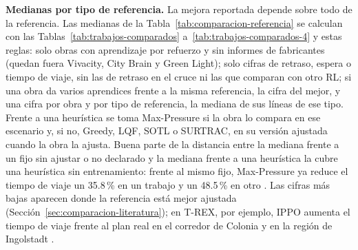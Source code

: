 \textbf{Medianas por tipo de referencia.} La mejora reportada depende
sobre todo de la referencia. Las medianas de la
Tabla~\ref{tab:comparacion-referencia} se calculan con las
Tablas~\ref{tab:trabajos-comparados} a~\ref{tab:trabajos-comparados-4}
y estas reglas: solo obras con aprendizaje por refuerzo y sin informes
de fabricantes (quedan fuera Vivacity, City Brain y Green Light); solo
cifras de retraso, espera o tiempo de viaje, sin las de retraso en el
cruce ni las que comparan con otro RL; si una obra da varios aprendices
frente a la misma referencia, la cifra del mejor, y una cifra por obra
y por tipo de referencia, la mediana de sus líneas de ese tipo. Frente
a una heurística se toma Max-Pressure si la obra lo compara en ese
escenario y, si no, Greedy, LQF, SOTL o SURTRAC, en su versión ajustada
cuando la obra la ajusta. Buena parte de la distancia entre la mediana
frente a un fijo sin ajustar o no declarado y la mediana frente a una
heurística la cubre una heurística sin entrenamiento: frente al mismo
fijo, Max-Pressure ya reduce el tiempo de viaje un 35.8\,\% en un
trabajo \citep{Wu2021_EfficientMP} y un 48.5\,\% en otro
\citep{Mei2024_LibSignal}. Las cifras más bajas aparecen donde la
referencia está mejor ajustada (Sección~\ref{sec:comparacion-literatura});
en T-REX, por ejemplo, IPPO aumenta el tiempo de viaje frente al plan
real en el corredor de Colonia y en la región de Ingolstadt
\citep{Nguyen2025_TREX}.
